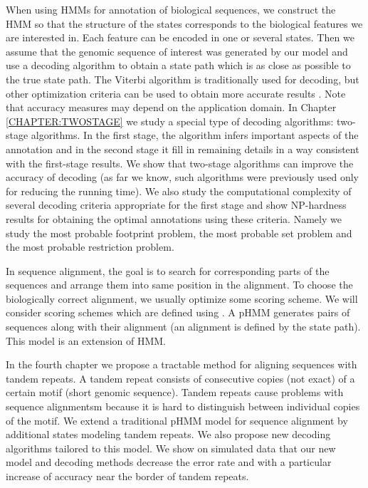 When using HMMs for annotation of biological sequences, we construct the
HMM so  that the structure of the states corresponds to the biological features we
are interested in.
Each feature can be encoded in one or several states.  Then we assume that the genomic sequence of interest was generated by our model and use a decoding
algorithm to obtain a state path which is as close as possible to the true
state path. The Viterbi algorithm
\cite{Durbin1998} is traditionally used for decoding, but other optimization criteria can be used to obtain more
accurate results \cite{Brown2010, Gross2007, Nanasi2010, Truszkowski2011}. Note that 
accuracy measures may depend on the application domain.  In Chapter
\ref{CHAPTER:TWOSTAGE} we study a special type of decoding algorithms: two-stage 
algorithms. In the first stage, the algorithm infers important aspects of
the annotation and in the second stage it fill in remaining details in a way
consistent with the first-stage results.  We show that  two-stage
algorithms can improve the accuracy of decoding (as far we know, such
algorithms were previously used only for reducing the running time). We also
study the computational complexity of several decoding criteria appropriate for
the first stage and show NP-hardness results for obtaining the optimal
annotations using these criteria. Namely we study the most probable footprint
problem, the most probable set problem and the most probable restriction
problem. 

In sequence alignment, the goal is to search for
corresponding  parts of the sequences and arrange them into same position in the
alignment.  To choose the biologically correct alignment, we usually optimize some
scoring scheme. We will consider scoring schemes which are  defined using
. A pHMM generates pairs of
sequences along with their alignment (an alignment is defined by the state
path).  This model is an extension of HMM. 


In the fourth chapter we propose a tractable method for aligning sequences with
tandem repeats. A tandem repeat consists of consecutive copies (not exact) of a
certain motif (short genomic sequence). Tandem repeats cause problems with
sequence alignmentsm because it is hard to distinguish between individual copies of the motif.
We extend a traditional pHMM model for sequence alignment by additional states
modeling tandem repeats. We also propose new decoding algorithms tailored to
this model. We show on simulated data that our new model and decoding methods
decrease the error rate and with a particular increase of accuracy near the border of tandem repeats.

